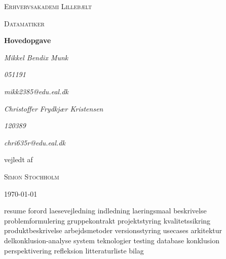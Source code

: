 \documentclass[a4paper, 11pt, danish]{report}
\begin{document}
\begin{titlepage}
    \centering
    {\scshape\LARGE Erhvervsakademi Lillebælt \par}
    \vspace{1cm}
    {\scshape\Large Datamatiker\par}
    \vspace{1.5cm}
    {\huge\bfseries Hovedopgave\par}
    \vspace{2cm}
    {\Large\itshape Mikkel Bendix Munk\par}
    {\small\itshape 051191\par}
    {\small\itshape mikk2385@edu.eal.dk\par}
    {\Large\itshape Christoffer Frydkjær Kristensen\par}
    {\small\itshape 120389\par}
    {\small\itshape chri635r@edu.eal.dk\par}
    \vfill
    vejledt af\par
    \textsc{Simon Stochholm}

    \vfill

    {\large \today\par}
\end{titlepage}
\tableofcontents{}
\newpage
{resume}
{forord}
{laesevejledning}
{indledning}
{laeringsmaal}
{beskrivelse}
{problemformulering}
{gruppekontrakt}
{projektstyring}
{kvalitetssikring}
{produktbeskrivelse}
{arbejdsmetoder}
{versionsstyring}
{usecases}
{arkitektur}
{delkonklusion-analyse}
{system}
{teknologier}
{testing}
{database}
{konklusion}
{perspektivering}
{refleksion}
{litteraturliste}
{bilag}
\end{document}

